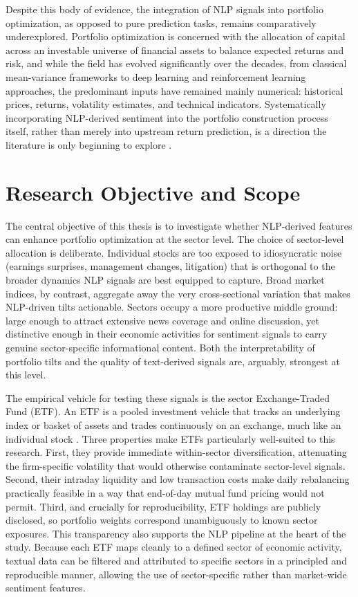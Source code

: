 Despite this body of evidence, the integration of NLP signals into portfolio optimization, as opposed to pure prediction tasks, remains comparatively underexplored. Portfolio optimization is concerned with the allocation of capital across an investable universe of financial assets to balance expected returns and risk, and while the field has evolved significantly over the decades, from classical mean-variance frameworks to deep learning and reinforcement learning approaches, the predominant inputs have remained mainly numerical: historical prices, returns, volatility estimates, and technical indicators. Systematically incorporating NLP-derived sentiment into the portfolio construction process itself, rather than merely into upstream return prediction, is a direction the literature is only beginning to explore \cite{Markowitz1952, 0df79, 3ac6b}.

\section{Research Objective and Scope}

The central objective of this thesis is to investigate whether NLP-derived features can enhance portfolio optimization at the sector level. The choice of sector-level allocation is deliberate. Individual stocks are too exposed to idiosyncratic noise (earnings surprises, management changes, litigation) that is orthogonal to the broader dynamics NLP signals are best equipped to capture. Broad market indices, by contrast, aggregate away the very cross-sectional variation that makes NLP-driven tilts actionable. Sectors occupy a more productive middle ground: large enough to attract extensive news coverage and online discussion, yet distinctive enough in their economic activities for sentiment signals to carry genuine sector-specific informational content. Both the interpretability of portfolio tilts and the quality of text-derived signals are, arguably, strongest at this level.

The empirical vehicle for testing these signals is the sector Exchange-Traded Fund (ETF). An ETF is a pooled investment vehicle that tracks an underlying index or basket of assets and trades continuously on an exchange, much like an individual stock \cite{hill2015etf}. Three properties make ETFs particularly well-suited to this research. First, they provide immediate within-sector diversification, attenuating the firm-specific volatility that would otherwise contaminate sector-level signals. Second, their intraday liquidity and low transaction costs make daily rebalancing practically feasible in a way that end-of-day mutual fund pricing would not permit. Third, and crucially for reproducibility, ETF holdings are publicly disclosed, so portfolio weights correspond unambiguously to known sector exposures. This transparency also supports the NLP pipeline at the heart of the study. Because each ETF maps cleanly to a defined sector of economic activity, textual data can be filtered and attributed to specific sectors in a principled and reproducible manner, allowing the use of sector-specific rather than market-wide sentiment features.

